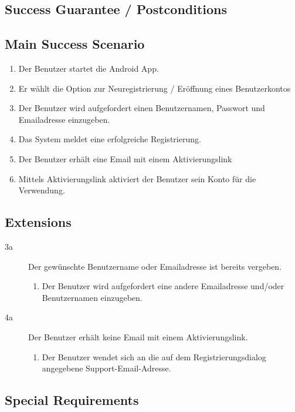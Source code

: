 \documentclass[10pt,a4paper]{scrartcl}
\begin{document}
\subsection*{Success Guarantee / Postconditions}


\subsection*{Main Success Scenario}

\begin{enumerate}
\item Der Benutzer startet die Android App.
\item Er wählt die Option zur Neuregistrierung / Eröffnung eines Benutzerkontos
\item Der Benutzer wird aufgefordert einen Benutzernamen, Passwort und Emailadresse einzugeben.
\item Das System meldet eine erfolgreiche Registrierung.
\item Der Benutzer erhält eine Email mit einem Aktivierungslink
\item Mittels Aktivierungslink aktiviert der Benutzer sein Konto für die Verwendung. 
\end{enumerate}


\subsection*{Extensions}

\begin{description}
\item[3a] Der gewünschte Benutzername oder Emailadresse ist bereits vergeben.
	\begin{enumerate}
	\item Der Benutzer wird aufgefordert eine andere Emailadresse und/oder Benutzernamen 		einzugeben.
	\end{enumerate}
\item[4a] Der Benutzer erhält keine Email mit einem Aktivierungslink.
	\begin{enumerate}
	\item Der Benutzer wendet sich an die auf dem Registrierungsdialog angegebene Support-Email-Adresse.
	\end{enumerate}

\end{description}


\subsection*{Special Requirements}
\end{document}
